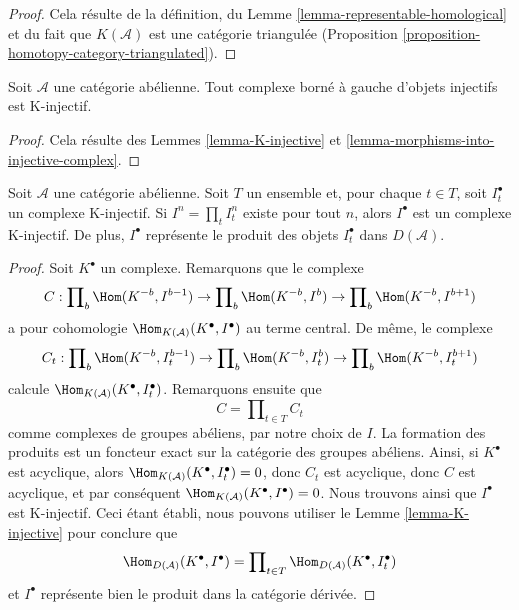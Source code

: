 \begin{proof}
Cela résulte de la définition, du
Lemme \ref{lemma-representable-homological} et du fait que $K(\mathcal{A})$
est une catégorie triangulée
(Proposition \ref{proposition-homotopy-category-triangulated}).
\end{proof}

\begin{lemma}
\label{lemma-bounded-below-injectives-K-injective}
Soit $\mathcal{A}$ une catégorie abélienne. Tout complexe borné à gauche
d'objets injectifs est K-injectif.
\end{lemma}

\begin{proof}
Cela résulte des Lemmes \ref{lemma-K-injective} et
\ref{lemma-morphisms-into-injective-complex}.
\end{proof}

\begin{lemma}
\label{lemma-product-K-injective}
Soit $\mathcal{A}$ une catégorie abélienne. Soit $T$ un ensemble et, pour
chaque $t \in T$, soit $I_t^\bullet$ un complexe K-injectif. Si
$I^n = \prod_t I_t^n$ existe pour tout $n$, alors $I^\bullet$ est un complexe
K-injectif. De plus, $I^\bullet$ représente le produit des objets
$I_t^\bullet$ dans $D(\mathcal{A})$.
\end{lemma}

\begin{proof}
Soit $K^\bullet$ un complexe. Remarquons que le complexe
$$
C :
\prod\nolimits_b \Hom(K^{-b}, I^{b - 1}) \to
\prod\nolimits_b \Hom(K^{-b}, I^b) \to
\prod\nolimits_b \Hom(K^{-b}, I^{b + 1})
$$
a pour cohomologie $\Hom_{K(\mathcal{A})}(K^\bullet, I^\bullet)$ au terme
central. De même, le complexe
$$
C_t :
\prod\nolimits_b \Hom(K^{-b}, I_t^{b - 1}) \to
\prod\nolimits_b \Hom(K^{-b}, I_t^b) \to
\prod\nolimits_b \Hom(K^{-b}, I_t^{b + 1})
$$
calcule $\Hom_{K(\mathcal{A})}(K^\bullet, I_t^\bullet)$.
Remarquons ensuite que
$$
C = \prod\nolimits_{t \in T} C_t
$$
comme complexes de groupes abéliens, par notre choix de $I$.
La formation des produits est un foncteur exact sur la catégorie des groupes
abéliens. Ainsi, si $K^\bullet$ est acyclique, alors
$\Hom_{K(\mathcal{A})}(K^\bullet, I_t^\bullet) = 0$, donc $C_t$ est
acyclique, donc $C$ est acyclique, et par conséquent
$\Hom_{K(\mathcal{A})}(K^\bullet, I^\bullet) = 0$.
Nous trouvons ainsi que $I^\bullet$ est K-injectif.
Ceci étant établi, nous pouvons utiliser le Lemme \ref{lemma-K-injective}
pour conclure que
$$
\Hom_{D(\mathcal{A})}(K^\bullet, I^\bullet)
=
\prod\nolimits_{t \in T} \Hom_{D(\mathcal{A})}(K^\bullet, I_t^\bullet)
$$
et $I^\bullet$ représente bien le produit dans la catégorie dérivée.
\end{proof}


